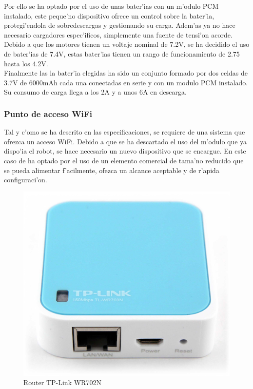 \documentclass[twoside,12pt]{article}
\begin{document}
Por ello se ha optado por el uso de unas bater'ias con un m'odulo PCM instalado, este peque'no dispositivo ofrece un control sobre la bater'ia, protegi'endola de sobredescargas y gestionando su carga. Adem'as ya no hace necesario cargadores espec'ificos, simplemente una fuente de tensi'on acorde. Debido a que los motores tienen un voltaje nominal de 7.2V, se ha decidido el uso de bater'ias de 7.4V, estas bater'ias tienen un rango de funcionamiento de 2.75 hasta los 4.2V. \\

Finalmente las la bater'ia elegidas ha sido un conjunto formado por dos celdas de 3.7V de 6000mAh cada una conectadas en serie y con un modulo PCM instalado. Su consumo de carga llega a los 2A y a unos 6A en descarga.

\subsubsection{Punto de acceso WiFi}
Tal y c'omo se ha descrito en las especificaciones, se requiere de una sistema que ofrezca un acceso WiFi. Debido a que se ha descartado el uso del m'odulo que ya dispo'ia el robot, se hace necesario un nuevo dispositivo que se encargue. En este caso de ha optado por el uso de un elemento comercial de tama'no reducido que se pueda alimentar f'acilmente, ofezca un alcance aceptable y de r'apida configuraci'on.

\begin{figure}[ht]
\centering
\includegraphics[scale=0.15]{images/TL-WR702N.png} 
\caption{Router TP-Link WR702N}
\label{fig:TL-WR702N}
\end{figure}
\end{document}

